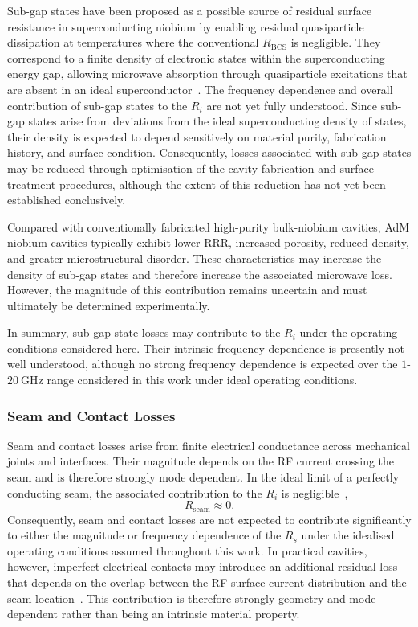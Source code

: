 \documentclass[
  aps,
  physrev,
  reprint,
  superscriptaddress,
  nofootinbib,
  amsmath,
  amssymb
]{revtex4-2}
\begin{document}
Sub-gap states have been proposed as a possible source of residual surface resistance in superconducting niobium by enabling residual quasiparticle dissipation at temperatures where the conventional $R_{\mathrm{BCS}}$ is negligible. They correspond to a finite density of electronic states within the superconducting energy gap, allowing microwave absorption through quasiparticle excitations that are absent in an ideal superconductor~\cite{Gurevich2012}. The frequency dependence and overall contribution of sub-gap states to the $R_i$ are not yet fully understood. Since sub-gap states arise from deviations from the ideal superconducting density of states, their density is expected to depend sensitively on material purity, fabrication history, and surface condition. Consequently, losses associated with sub-gap states may be reduced through optimisation of the cavity fabrication and surface-treatment procedures, although the extent of this reduction has not yet been established conclusively.

Compared with conventionally fabricated high-purity bulk-niobium cavities, AdM niobium cavities typically exhibit lower RRR, increased porosity, reduced density, and greater microstructural disorder. These characteristics may increase the density of sub-gap states and therefore increase the associated microwave loss. However, the magnitude of this contribution remains uncertain and must ultimately be determined experimentally.

In summary, sub-gap-state losses may contribute to the $R_i$ under the operating conditions considered here. Their intrinsic frequency dependence is presently not well understood, although no strong frequency dependence is expected over the $1$-$20~\mathrm{GHz}$ range considered in this work under ideal operating conditions.

\subsubsection[\appendixname~\thesubsubsection]{Seam and Contact Losses}
\label{app:Rs_seam}

Seam and contact losses arise from finite electrical conductance across mechanical joints and interfaces. Their magnitude depends on the RF current crossing the seam and is therefore strongly mode dependent. In the ideal limit of a perfectly conducting seam, the associated contribution to the $R_i$ is negligible~\cite{Brecht2015},
\begin{equation}
    R_{\mathrm{seam}}\approx0.
\end{equation}
Consequently, seam and contact losses are not expected to contribute significantly to either the magnitude or frequency dependence of the $R_s$ under the idealised operating conditions assumed throughout this work. In practical cavities, however, imperfect electrical contacts may introduce an additional residual loss that depends on the overlap between the RF surface-current distribution and the seam location~\cite{Brecht2015}. This contribution is therefore strongly geometry and mode dependent rather than being an intrinsic material property. 
\end{document}
